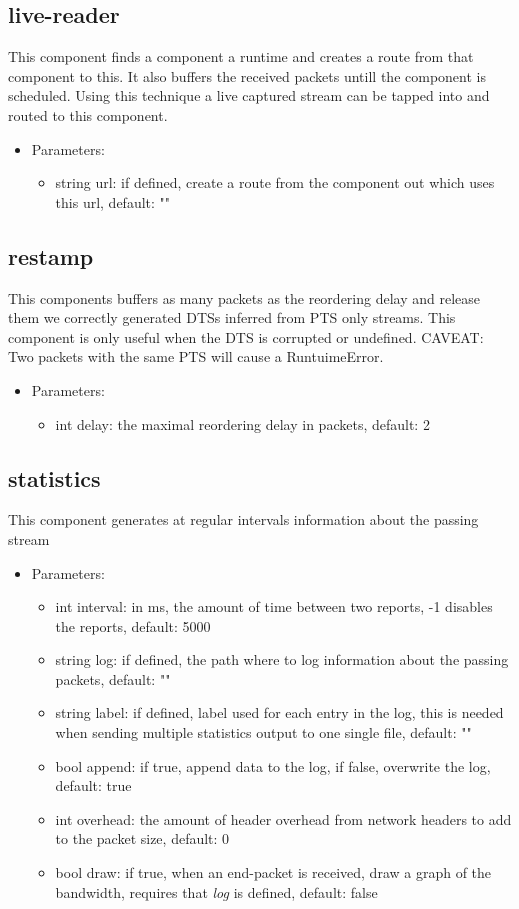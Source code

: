 \subsection{live-reader}
This component finds a component a runtime and creates a route from that component to this. It also buffers the received packets untill the component is scheduled. Using this technique a live captured stream can be tapped into and routed to this component.
\begin{itemize}
\item Parameters:
\begin{itemize}
\item string url: if defined, create a route from the component out which uses this url, default: ""
\end{itemize}
\end{itemize}
\subsection{restamp}
This components buffers as many packets as the reordering delay and release them we correctly generated DTSs inferred from PTS only streams. This component is only useful when the DTS is corrupted or undefined. CAVEAT: Two packets with the same PTS will cause a RuntuimeError.
\begin{itemize}
\item Parameters:
\begin{itemize}
\item int delay: the maximal reordering delay in packets, default: 2
\end{itemize}
\end{itemize}
\subsection{statistics}
This component generates at regular intervals information about the passing stream
\begin{itemize}
\item Parameters:
\begin{itemize}
\item int interval: in ms, the amount of time between two reports, -1 disables the reports, default: 5000
\item string log: if defined, the path where to log information about the passing packets, default: ""
\item string label: if defined, label used for each entry in the log, this is needed when sending multiple statistics output to one single file, default: ""
\item bool append: if true, append data to the log, if false, overwrite the log, default: true
\item int overhead: the amount of header overhead from network headers to add to the packet size, default: 0
\item bool draw: if true, when an end-packet is received, draw a graph of the bandwidth, requires that \textit{log} is defined, default: false
\end{itemize}
\end{itemize}
